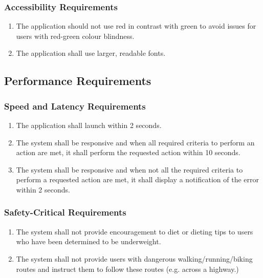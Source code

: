 \documentclass[12pt,letterpaper]{article}
\begin{document}
\subsubsection{Accessibility Requirements}
\label{ssub:accessibility_requirements}
\begin{enumerate}[{UH-A}1. ]
	\item The application should not use red in contrast with green to avoid issues for users with red-green colour blindness.
	
	\item The application shall use larger, readable fonts.
\end{enumerate}


\subsection{Performance Requirements}
\label{sub:performance_requirements}

\subsubsection{Speed and Latency Requirements}
\label{ssub:speed_and_latency_requirements}
\begin{enumerate}[{PR-SL}1. ]
	\item The application shall launch within 2 seconds.
	
	\item The system shall be responsive and when all required criteria to perform an action are met, it shall perform the requested action within 10 seconds.
	
	\item The system shall be responsive and when not all the required criteria to perform a requested action are met, it shall display a notification of the error within 2 seconds.
\end{enumerate}

\subsubsection{Safety-Critical Requirements}
\label{ssub:safety_critical_requirements}
\begin{enumerate}[{PR-SC}1. ]
	\item The system shall not provide encouragement to diet or dieting tips to users who have been determined to be underweight.
	
	\item The system shall not provide users with dangerous walking/running/biking routes and instruct them to follow these routes (e.g. across a highway.)
\end{enumerate}
\end{document}
